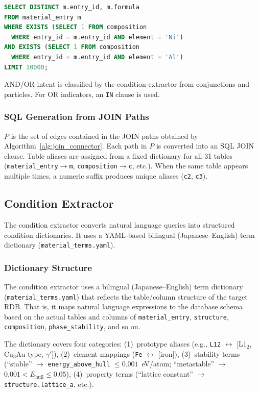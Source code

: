 \begin{lstlisting}[language=SQL,caption={Multi-element AND},label=lst:exists,numbers=none]
SELECT DISTINCT m.entry_id, m.formula
FROM material_entry m
WHERE EXISTS (SELECT 1 FROM composition
  WHERE entry_id = m.entry_id AND element = 'Ni')
AND EXISTS (SELECT 1 FROM composition
  WHERE entry_id = m.entry_id AND element = 'Al')
LIMIT 10000;
\end{lstlisting}

AND/OR intent is classified by the condition extractor from conjunctions and particles. For OR indicators, an \texttt{IN} clause is used.

\subsubsection{SQL Generation from JOIN Paths}

$P$ is the set of edges contained in the JOIN paths obtained by Algorithm~\ref{alg:join_connector}. Each path in $P$ is converted into an SQL JOIN clause. Table aliases are assigned from a fixed dictionary for all 31 tables (\texttt{material\_entry}$\to$\texttt{m}, \texttt{composition}$\to$\texttt{c}, etc.). When the same table appears multiple times, a numeric suffix produces unique aliases (\texttt{c2}, \texttt{c3}).

\subsection{Condition Extractor}

The condition extractor converts natural language queries into structured condition dictionaries. It uses a YAML-based bilingual (Japanese--English) term dictionary (\texttt{material\_terms.yaml}).

\subsubsection{Dictionary Structure}

The condition extractor uses a bilingual (Japanese--English) term dictionary (\texttt{material\_terms.yaml}) that reflects the table/column structure of the target RDB. That is, it maps natural language expressions to the database schema based on the actual tables and columns of \texttt{material\_entry}, \texttt{structure}, \texttt{composition}, \texttt{phase\_stability}, and so on.

The dictionary covers four categories:
(1)~prototype aliases (e.g., \texttt{L12} $\leftrightarrow$ [L1$_2$, Cu$_3$Au type, $\gamma'$]),
(2)~element mappings (\texttt{Fe} $\leftrightarrow$ [iron]),
(3)~stability terms (``stable'' $\to$ \texttt{energy\_above\_hull} $\leq 0.001$~eV/atom; ``metastable'' $\to$ $0.001 < E_\text{hull} \leq 0.05$),
(4)~property terms (``lattice constant'' $\to$ \texttt{structure.lattice\_a}, etc.).

